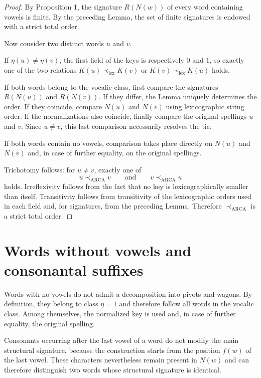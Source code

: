 \documentclass[11pt,a4paper]{article}
\theoremstyle{definition}
\theoremstyle{remark}
\newcommand{\ARCA}{\mathrm{ARCA}}
\newcommand{\precA}{\prec_{\ARCA}}
\newcommand{\lexord}{\prec_{\mathrm{lex}}}
\newcommand{\Nrm}{N}
\newcommand{\Sig}{R}
\newcommand{\Class}{\eta}
\begin{document}
\begin{proof}
By Proposition 1, the signature $\Sig(\Nrm(w))$ of every word containing vowels is finite. By the preceding Lemma, the set of finite signatures is endowed with a strict total order.

Now consider two distinct words $u$ and $v$.

If $\Class(u)\neq\Class(v)$, the first field of the keys is respectively $0$ and $1$, so exactly one of the two relations $K(u)\lexord K(v)$ or $K(v)\lexord K(u)$ holds.

If both words belong to the vocalic class, first compare the signatures $\Sig(\Nrm(u))$ and $\Sig(\Nrm(v))$. If they differ, the Lemma uniquely determines the order. If they coincide, compare $\Nrm(u)$ and $\Nrm(v)$ using lexicographic string order. If the normalizations also coincide, finally compare the original spellings $u$ and $v$. Since $u\neq v$, this last comparison necessarily resolves the tie.

If both words contain no vowels, comparison takes place directly on $\Nrm(u)$ and $\Nrm(v)$ and, in case of further equality, on the original spellings.

Trichotomy follows: for $u\neq v$, exactly one of
\[
  u\precA v
  \qquad\text{and}\qquad
  v\precA u
\]
holds. Irreflexivity follows from the fact that no key is lexicographically smaller than itself. Transitivity follows from transitivity of the lexicographic orders used in each field and, for signatures, from the preceding Lemma. Therefore $\precA$ is a strict total order.
\end{proof}

\section{Words without vowels and consonantal suffixes}

Words with no vowels do not admit a decomposition into pivots and wagons. By definition, they belong to class $\Class=1$ and therefore follow all words in the vocalic class. Among themselves, the normalized key is used and, in case of further equality, the original spelling.

Consonants occurring after the last vowel of a word do not modify the main structural signature, because the construction starts from the position $f(w)$ of the last vowel. These characters nevertheless remain present in $\Nrm(w)$ and can therefore distinguish two words whose structural signature is identical.
\end{document}
